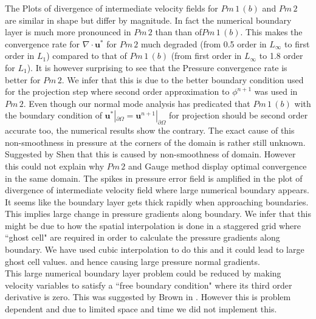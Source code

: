 The Plots of divergence of intermediate velocity fields for $Pm\,1\,(b)$ and $Pm\,2$ are similar in shape but differ by magnitude. In fact the numerical boundary layer is much more pronounced in $Pm\,2$ than than of$Pm\,1\,(b)$. This makes the convergence rate for $\nabla \cdot \textbf{u}^*$ for $Pm\,2$ much degraded (from 0.5 order in $L_\infty$ to first order in $L_1$) compared to that of $Pm\,1\,(b)$ (from first order in $L_\infty$ to 1.8 order for $L_1$). It is however surprising to see that the Pressure convergence rate is better for $Pm\,2$. We infer that this is due to the better boundary condition used for the projection step where second order approximation to $\phi^{n+1}$ was used in $Pm\,2$. Even though our normal mode analysis has predicated that $Pm\,1\,(b)$ with the boundary condition of $\textbf{u}^*|_{\partial \Omega} = \textbf{u}^{n+1}|_{\partial \Omega}$ for projection should be second order accurate too, the numerical results show the contrary. The exact cause of this non-smoothness in pressure at the corners of the domain is rather still unknown. Suggested by Shen that this is caused by non-smoothness of domain. However this could not explain why $Pm\,2$ and Gauge method display optimal convergence in the same domain. The spikes in pressure error field is amplified in the plot of divergence of intermediate velocity field where large numerical boundary appears. It seems like the boundary layer gets thick rapidly when approaching boundaries. This implies large change in pressure gradients along boundary. We infer that this might be due to how the spatial interpolation is done in a staggered grid where ``ghost cell" are required in order to calculate the pressure gradients along boundary. We have used cubic interpolation to do this and it could lead to large ghost cell values. and hence causing large pressure normal gradients.\\

This large numerical boundary layer problem could be reduced by making velocity variables to satisfy a ``free boundary condition" where its third order derivative is zero. This was suggested by Brown in \cite{brown2001accurate}. However this is problem dependent and due to limited space and time we did not implement this.\\



